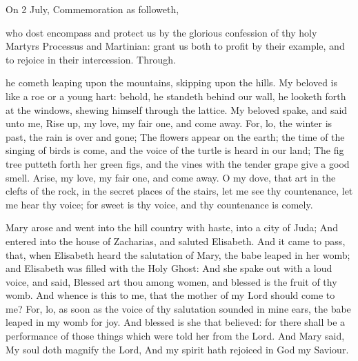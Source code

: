 \begin{rubric}
	 On 2 July, Commemoration  as followeth,
\end{rubric}
 who dost encompass and protect us by the glorious confession of thy holy Martyrs Processus and Martinian: grant us both to profit by their example, and to rejoice in their intercession. Through.

 he cometh leaping upon the mountains, skipping upon the hills. My beloved is like a roe or a young hart: behold, he standeth behind our wall, he looketh forth at the windows, shewing himself through the lattice. My beloved spake, and said unto me, Rise up, my love, my fair one, and come away. For, lo, the winter is past, the rain is over and gone; The flowers appear on the earth; the time of the singing of birds is come, and the voice of the turtle is heard in our land; The fig tree putteth forth her green figs, and the vines with the tender grape give a good smell. Arise, my love, my fair one, and come away. O my dove, that art in the clefts of the rock, in the secret places of the stairs, let me see thy countenance, let me hear thy voice; for sweet is thy voice, and thy countenance is comely.


 Mary arose and went into the hill country with haste, into a city of Juda; And entered into the house of Zacharias, and saluted Elisabeth. And it came to pass, that, when Elisabeth heard the salutation of Mary, the babe leaped in her womb; and Elisabeth was filled with the Holy Ghost: And she spake out with a loud voice, and said, Blessed art thou among women, and blessed is the fruit of thy womb. And whence is this to me, that the mother of my Lord should come to me? For, lo, as soon as the voice of thy salutation sounded in mine ears, the babe leaped in my womb for joy. And blessed is she that believed: for there shall be a performance of those things which were told her from the Lord. And Mary said, My soul doth magnify the Lord, And my spirit hath rejoiced in God my Saviour.

